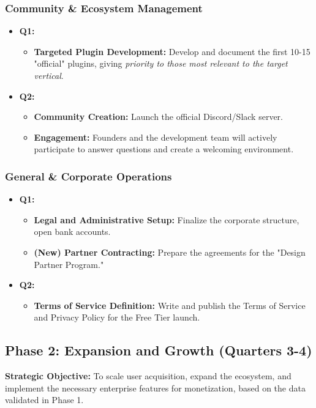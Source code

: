 \documentclass[11pt, a4paper, oneside]{article}
\begin{document}
\subsubsection*{Community \& Ecosystem Management}
\begin{itemize}[leftmargin=*]
    \item \textbf{Q1:}
    \begin{itemize}
        \item \textbf{Targeted Plugin Development:} Develop and document the first 10-15 "official" plugins, giving \textit{priority to those most relevant to the target vertical}.
    \end{itemize}
    \item \textbf{Q2:}
    \begin{itemize}
        \item \textbf{Community Creation:} Launch the official Discord/Slack server.
        \item \textbf{Engagement:} Founders and the development team will actively participate to answer questions and create a welcoming environment.
    \end{itemize}
\end{itemize}

\subsubsection*{General \& Corporate Operations}
\begin{itemize}[leftmargin=*]
    \item \textbf{Q1:}
    \begin{itemize}
        \item \textbf{Legal and Administrative Setup:} Finalize the corporate structure, open bank accounts.
        \item \textbf{(New) Partner Contracting:} Prepare the agreements for the "Design Partner Program."
    \end{itemize}
    \item \textbf{Q2:}
    \begin{itemize}
        \item \textbf{Terms of Service Definition:} Write and publish the Terms of Service and Privacy Policy for the Free Tier launch.
    \end{itemize}
\end{itemize}

\clearpage

\subsection{Phase 2: Expansion and Growth (Quarters 3-4)}
\textbf{Strategic Objective:} To scale user acquisition, expand the ecosystem, and implement the necessary enterprise features for monetization, based on the data validated in Phase 1.
\end{document}
